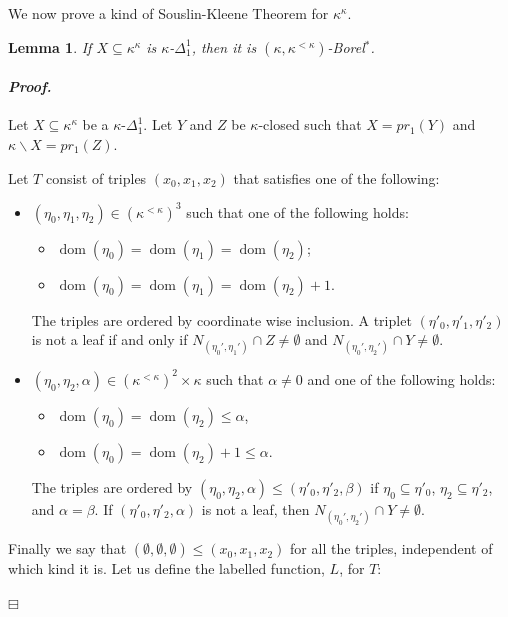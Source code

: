 \documentclass[12pt,a4paper]{amsart}
\newtheorem{lemma}[thm]{Lemma}
\theoremstyle{definition}
\theoremstyle{remark}
\DeclareMathOperator{\dom}{dom}
\newenvironment{cproof}{\paragraph{\emph{Proof.\,}}}{\hfill{$\boxminus$}\par\vspace{2mm}}
\def\borelstar{Borel\nobreak\hspace{1pt}$^*$}
\begin{document}
We now prove a kind of Souslin-Kleene Theorem for $\kappa^\kappa$.
\begin{lemma}
If 
 $X\subseteq\kappa^\kappa$ is $\kappa$-$\Delta^1_1$, then it is $(\kappa,\kappa^{<\kappa})$-\borelstar.
\end{lemma}

\begin{cproof}

Let $X\subseteq \kappa^\kappa$ be a $\kappa$-$\Delta_1^1$. Let $Y$ and $Z$ be $\kappa$-closed such that $X=pr_1(Y)$ and $\kappa\backslash X=pr_1(Z)$.

Let $T$ consist of triples $(x_0,x_1,x_2)$ that satisfies one of the following:
\begin{itemize}
    \item $(\eta_0,\eta_1,\eta_2)\in (\kappa^{<\kappa})^3$ such that one of the following holds:
    \begin{itemize}
        \item $\dom(\eta_0)=\dom(\eta_1)=\dom(\eta_2)$;
        \item $\dom(\eta_0)=\dom(\eta_1)=\dom(\eta_2)+1$.
    \end{itemize}
    The triples are ordered by coordinate wise inclusion. 
    A triplet $(\eta'_0,\eta'_1,\eta'_2)$ is not a leaf %
    if and only if $N_{(\eta_0',\eta_1')}\cap Z\neq\emptyset$ and $N_{(\eta_0',\eta_2')}\cap Y\neq\emptyset$.
    \item $(\eta_0,\eta_2,\alpha)\in (\kappa^{<\kappa})^2\times\kappa$ such that $\alpha\neq 0$ and one of the following holds:
    \begin{itemize}
        \item $\dom(\eta_0)=\dom(\eta_2)\leq \alpha$,
        \item $\dom(\eta_0)=\dom(\eta_2)+1\leq \alpha$.
    \end{itemize}
    The triples are ordered by $(\eta_0,\eta_2,\alpha)\leq (\eta'_0,\eta'_2,\beta)$ if $\eta_0\subseteq\eta'_0$, $\eta_2\subseteq\eta'_2$, and $\alpha=\beta$. 
    If $(\eta'_0,\eta'_2,\alpha)$ is not a leaf, %
    then $N_{(\eta_0',\eta_2')}\cap Y\neq\emptyset$.
\end{itemize}
Finally we say that $(\emptyset,\emptyset,\emptyset)\leq (x_0,x_1,x_2)$ for all the triples, independent of which kind it is.
Let us define the labelled function, $L$, for $T$:

\end{cproof}
\end{document}
